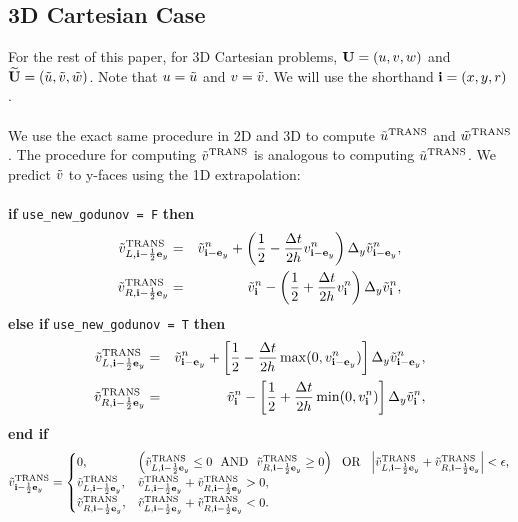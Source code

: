 \subsection{3D Cartesian Case}
For the rest of this paper, for 3D Cartesian problems, ${\bf U} = (u,v,w)$
and $\widetilde{{\bf U}} = (\tilde{u},\tilde{v},\tilde{w})$.  Note that $u = \tilde{u}$ and $v = \tilde{v}$.
We will use the shorthand ${\bf i} = (x,y,r)$.\\ \\
We use the exact same procedure in 2D and 3D to compute $\tilde{u}^{\rm TRANS}$ and 
$\tilde{w}^{\rm TRANS}$. The procedure for computing $\tilde{v}^{\rm TRANS}$ is analogous to
computing $\tilde{u}^{\rm TRANS}$.  We predict $\tilde{v}$ to y-faces using the
1D extrapolation:\\ \\
{\bf if} {\tt use\_new\_godunov = F} {\bf then}
\begin{eqnarray}
\tilde{v}_{L,{\bf i}-\frac{1}{2}{\bf e}_y}^{\rm TRANS} &=& \tilde{v}_{{\bf i}-{\bf e}_y}^n + \left(\frac{1}{2} - \frac{\Delta t}{2h}v_{{\bf i}-{\bf e}_y}^n\right)\Delta_y \tilde{v}_{{\bf i}-{\bf e}_y}^n, \\
\tilde{v}_{R,{\bf i}-\frac{1}{2}{\bf e}_y}^{\rm TRANS} &=& \tilde{v}_{{\bf i}}^n - \left(\frac{1}{2} + \frac{\Delta t}{2h}v_{{\bf i}}^n\right)\Delta_y \tilde{v}_{{\bf i}}^n,
\end{eqnarray}
{\bf else if} {\tt use\_new\_godunov = T} {\bf then}
\begin{eqnarray}
\tilde{v}_{L,{\bf i}-\frac{1}{2}{\bf e}_y}^{\rm TRANS} &=& \tilde{v}_{{\bf i}-{\bf e}_y}^n + \left[\frac{1}{2} - \frac{\Delta t}{2h}\max(0,v_{{\bf i}-{\bf e}_y}^n)\right]\Delta_y \tilde{v}_{{\bf i}-{\bf e}_y}^n, \\
\tilde{v}_{R,{\bf i}-\frac{1}{2}{\bf e}_y}^{\rm TRANS} &=& \tilde{v}_{{\bf i}}^n - \left[\frac{1}{2} + \frac{\Delta t}{2h}\min(0,v_{{\bf i}}^n)\right]\Delta_y \tilde{v}_{{\bf i}}^n,
\end{eqnarray}
{\bf end if}
\begin{equation}
\tilde{v}^{\rm TRANS}_{{\bf i}-\frac{1}{2}{\bf e}_y} =
\begin{cases}
0, & \left(\tilde{v}_{L,{\bf i}-\frac{1}{2}{\bf e}_y}^{\rm TRANS} \le 0 ~~ {\rm AND} ~~ \tilde{v}_{R,{\bf i}-\frac{1}{2}{\bf e}_y}^{\rm TRANS} \ge 0\right) ~~ {\rm OR} ~~ \left|\tilde{v}_{L,{\bf i}-\frac{1}{2}{\bf e}_y}^{\rm TRANS} + \tilde{v}_{R,{\bf i}-\frac{1}{2}{\bf e}_y}^{\rm TRANS}\right| < \epsilon, \\
\tilde{v}_{L,{\bf i}-\frac{1}{2}{\bf e}_y}^{\rm TRANS}, & \tilde{v}_{L,{\bf i}-\frac{1}{2}{\bf e}_y}^{\rm TRANS} + \tilde{v}_{R,{\bf i}-\frac{1}{2}{\bf e}_y}^{\rm TRANS} > 0, \\
\tilde{v}_{R,{\bf i}-\frac{1}{2}{\bf e}_y}^{\rm TRANS}, & \tilde{v}_{L,{\bf i}-\frac{1}{2}{\bf e}_y}^{\rm TRANS} + \tilde{v}_{R,{\bf i}-\frac{1}{2}{\bf e}_y}^{\rm TRANS} < 0. \\
\end{cases}
\end{equation}
